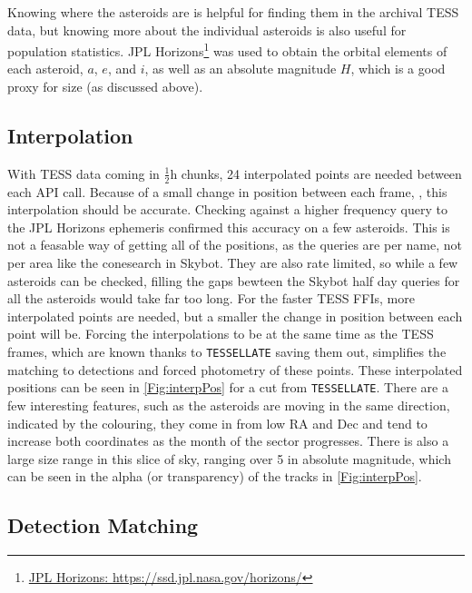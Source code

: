 \documentclass[12pt]{article}
\begin{document}
Knowing where the asteroids are is helpful for finding them in the archival TESS data, but knowing more about the individual asteroids is also useful for population statistics.
  {JPL Horizons}\footnote{\href{https://ssd.jpl.nasa.gov/horizons/}{JPL Horizons: https://ssd.jpl.nasa.gov/horizons/}} was used to obtain the orbital elements of each asteroid, $a$, $e$, and $i$, as well as an absolute magnitude $H$, which is a good proxy for size (as discussed above). %



\subsection{Interpolation}\label{SubSec:Interp}



With TESS data coming in $\frac12\unit{\hour}$ chunks, 24 interpolated points are needed between each API call.
Because of a small change in position between each frame, \citep[$\sim \qty{1}{\px}$ per frame][]{Pal2018}, this interpolation should be accurate.
Checking against a higher frequency query to the JPL Horizons ephemeris  confirmed this accuracy on a few asteroids. %
This is not a feasable way of getting all of the positions, as the queries are per name, not per area like the conesearch in Skybot.
They are also rate limited, so while a few asteroids can be checked, filling the gaps bewteen the Skybot half day queries for all the asteroids would take far too long.
For the faster TESS FFIs, more interpolated points are needed, but a smaller the change in position between each point will be.
Forcing the interpolations to be at the same time as the TESS frames, which are known thanks to \texttt{TESSELLATE} saving them out, simplifies the matching to detections and forced photometry of these points.
These interpolated positions can be seen in \autoref{Fig:interpPos} for a cut from \texttt{TESSELLATE}.
There are a few interesting features, such as the asteroids are moving in the same direction, indicated by the colouring, they come in from low RA and Dec and tend to increase both coordinates as the month of the sector progresses.
There is also a large size range in this slice of sky, ranging over \qty{5}{\mag} in absolute magnitude, which can be seen in the alpha (or transparency) of the tracks in \autoref{Fig:interpPos}.


\subsection{Detection Matching}\label{SubSec:Match}
\end{document}
